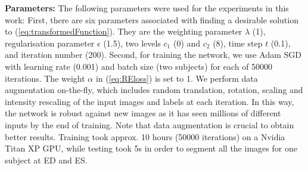 \documentclass[runningheads,a4paper]{llncs}
\begin{document}
\textbf{Parameters:} The following parameters were used for the experiments in this work: First, there are six parameters associated with finding a desirable solution to (\ref{eq:transformedFunction}). They are the weighting parameter $\lambda$ (1), regularisation parameter $\epsilon$ (1.5), two levels $c_1$ (0) and $c_2$ (8), time step $t$ (0.1), and iteration number (200). Second, for training the network, we use Adam SGD with learning rate (0.001) and batch size (two subjects) for each of 50000 iterations. The weight $\alpha$ in (\ref{eq:REloss}) is set to 1. We perform data augmentation on-the-fly, which includes random translation, rotation, scaling and intensity rescaling of the input images and labels at each iteration. In this way, the network is robust against new images as it has seen millions of different inputs by the end of training. Note that data augmentation is crucial to obtain better results. Training took approx. 10 hours (50000 iterations) on a Nvidia Titan XP GPU, while testing took 5s in order to segment all the images for one subject at ED and ES. 
\end{document}
